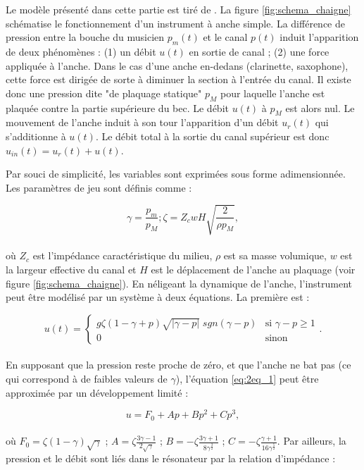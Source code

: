 Le modèle présenté dans cette partie est tiré de \cite{chaigne2008acoustique}. La figure \ref{fig:schema_chaigne} schématise le fonctionnement d'un instrument à anche simple. La différence de pression entre la bouche du musicien $p_m(t)$ et le canal $p(t)$ induit l'apparition de deux phénomènes : (1) un débit $u(t)$ en sortie de canal ; (2) une force appliquée à l'anche. Dans le cas d'une anche en-dedans (clarinette, saxophone), cette force est dirigée de sorte à diminuer la section à l'entrée du canal. Il existe donc une pression dite "de plaquage statique" $p_M$ pour laquelle l'anche est plaquée contre la partie supérieure du bec. Le débit $u(t)$ à $p_M$ est alors nul. Le mouvement de l'anche induit à son tour l'apparition d'un débit $u_r(t)$ qui s'additionne à $u(t)$. Le débit total à la sortie du canal supérieur est donc $u_{in}(t)=u_r(t)+u(t)$.

Par souci de simplicité, les variables sont exprimées sous forme adimensionnée. Les paramètres de jeu sont définis comme :

\begin{equation}
    \gamma = \frac{p_m}{p_M};\zeta=Z_cwH\sqrt{\frac{2}{\rho p_M}},
\end{equation}\\
où $Z_c$ est l'impédance caractéristique du milieu, $\rho$ est sa masse volumique, $w$ est la largeur effective du canal et $H$ est le déplacement de l'anche au plaquage (voir figure \ref{fig:schema_chaigne}). En néligeant la dynamique de l'anche, l'instrument peut être modélisé par un système à deux équations. La première est :

\begin{equation}
u(t) = \begin{cases}
g\zeta(1-\gamma+p)\sqrt{|\gamma-p|} \; sgn(\gamma-p)& \text{si }\gamma-p\geq 1\\
0              & \text{sinon}
\end{cases}.
\label{eq:2eq_1}
\end{equation}\\
En supposant que la pression reste proche de zéro, et que l'anche ne bat pas (ce qui correspond à de faibles valeurs de $\gamma$), l'équation \eqref{eq:2eq_1} peut être approximée par un développement limité :

\begin{equation}
    u = F_0 + Ap + Bp^2 + Cp^3,
\end{equation}\\
où $F_0=\zeta(1-\gamma)\sqrt{\gamma}$ ; $A=\zeta\frac{3\gamma-1}{2\sqrt{\gamma}}$ ; $B=-\zeta\frac{3\gamma+1}{8\gamma^{\frac{3}{2}}}$ ; $C=-\zeta\frac{\gamma+1}{16\gamma^{\frac{5}{2}}}$. Par ailleurs, la pression et le débit sont liés dans le résonateur par la relation d'impédance :

